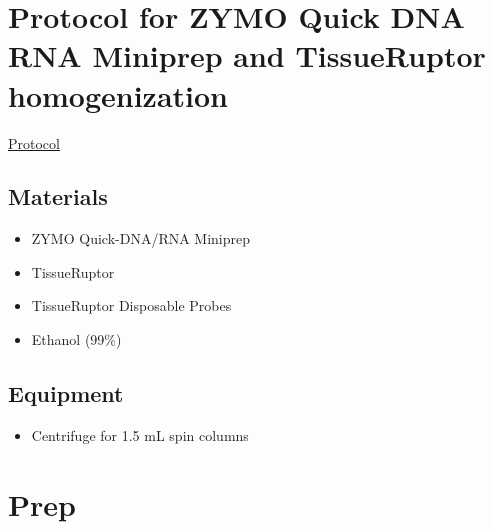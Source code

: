 \documentclass[
  letterpaper,
  DIV=11,
  numbers=noendperiod]{scrreprt}
\providecommand{\tightlist}{%
  \setlength{\itemsep}{0pt}\setlength{\parskip}{0pt}}\usepackage{longtable,booktabs,array}
\begin{document}
\hypertarget{protocol-for-zymo-quick-dna-rna-miniprep-and-tissueruptor-homogenization}{%
\section*{\texorpdfstring{\textbf{Protocol for ZYMO Quick DNA RNA
Miniprep and TissueRuptor
homogenization}}{Protocol for ZYMO Quick DNA RNA Miniprep and TissueRuptor homogenization}}\label{protocol-for-zymo-quick-dna-rna-miniprep-and-tissueruptor-homogenization}}

\href{https://files.zymoresearch.com/protocols/_d7001_quick-dna-rna_miniprep_kit.pdf}{Protocol}

\hypertarget{materials-1}{%
\subsection*{\texorpdfstring{\textbf{Materials}}{Materials}}\label{materials-1}}

\begin{itemize}
\item
  ZYMO Quick-DNA/RNA Miniprep
\item
  TissueRuptor
\item
  TissueRuptor Disposable Probes
\item
  Ethanol (99\%)
\end{itemize}

\hypertarget{equipment-2}{%
\subsection*{\texorpdfstring{\textbf{Equipment}}{Equipment}}\label{equipment-2}}

\begin{itemize}
\tightlist
\item
  Centrifuge for 1.5 mL spin columns
\end{itemize}

\hypertarget{prep}{%
\section*{\texorpdfstring{\textbf{Prep}}{Prep}}\label{prep}}
\end{document}
